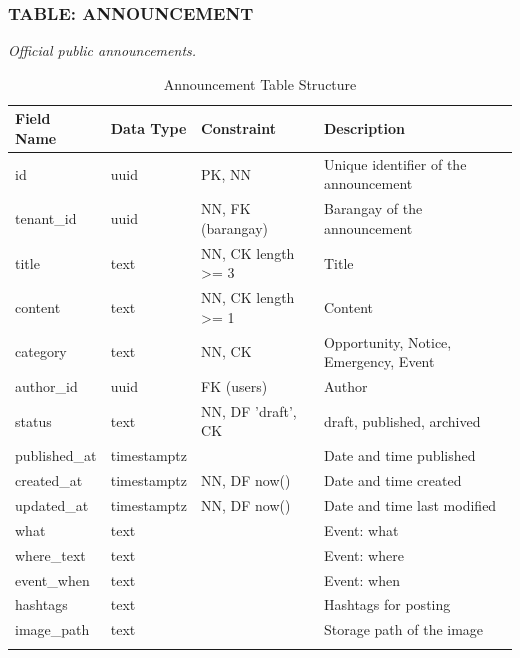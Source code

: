 \subsubsection*{TABLE: ANNOUNCEMENT}
\noindent\textit{Official public announcements.}
\begin{longtable}{|p{3.2cm}|p{2.2cm}|p{3.2cm}|p{5.4cm}|}
\hline
\textbf{Field Name} & \textbf{Data Type} & \textbf{Constraint} & \textbf{Description} \\ \hline
\endhead
\hline \endfoot
\hline \endlastfoot
id & uuid & PK, NN & Unique identifier of the announcement \\ \hline
tenant\_id & uuid & NN, FK (barangay) & Barangay of the announcement \\ \hline
title & text & NN, CK length >= 3 & Title \\ \hline
content & text & NN, CK length >= 1 & Content \\ \hline
category & text & NN, CK & Opportunity, Notice, Emergency, Event \\ \hline
author\_id & uuid & FK (users) & Author \\ \hline
status & text & NN, DF 'draft', CK & draft, published, archived \\ \hline
published\_at & timestamptz & & Date and time published \\ \hline
created\_at & timestamptz & NN, DF now() & Date and time created \\ \hline
updated\_at & timestamptz & NN, DF now() & Date and time last modified \\ \hline
what & text & & Event: what \\ \hline
where\_text & text & & Event: where \\ \hline
event\_when & text & & Event: when \\ \hline
hashtags & text & & Hashtags for posting \\ \hline
image\_path & text & & Storage path of the image \\ \hline
\caption{Announcement Table Structure}
\label{tab:announcement}
\end{longtable}
\vspace{3mm}


